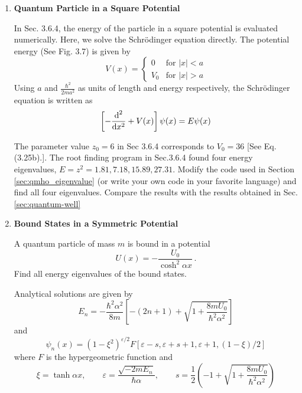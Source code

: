 \begin{enumerate}[labelwidth=0.5cm,labelindent=0cm,leftmargin=*,label=\bfseries \thechapter.\arabic*,align=left]

\item \textbf{Quantum Particle in a Square Potential} 

In Sec. 3.6.4, the energy of the particle in a square potential is evaluated numerically.  Here, we solve the Schr\"{o}dinger equation directly.  The potential energy (See Fig. 3.7) is given by
\begin{equation}
V(x) = \begin{cases}
0 & \text{for } |x|<a \\
V_0 & \text{for } |x|>a
\end{cases}
\end{equation}
Using $a$ and $\displaystyle\frac{\hbar^2}{2m a^2}$ as units of length and energy respectively,
the Schr\"{o}dinger equation is written as
\begin{equation}
\left [-\frac{\text{d}^2}{\text{d} x^2} + V(x) \right ] \psi(x) = E \psi(x)
\end{equation}

The parameter value $z_0=6$ in Sec 3.6.4 corresponds to $V_0=36$  [See Eq. (3.25b).].  The root finding program in Sec.3.6.4 found four energy eigenvalues, $E = z^2 =  1.81, 7.18, 15.89, 27.31$.
Modify the code used in Section \ref{sec:qmho_eigenvalue} (or write your own code in your favorite language) and find all four eigenvalues.  Compare the results with the results obtained in Sec.\ref{sec:quantum-well}

\item \textbf{Bound States in a Symmetric Potential}

A quantum particle of mass $m$ is bound in a potential
\begin{equation}
U(x) = - \frac{U_0}{\cosh^2 \alpha x}\, .
\end{equation}
Find all energy eigenvalues of the bound states.

Analytical solutions are given by
\begin{equation}
E_n = - \frac{\hbar^2 \alpha^2}{8 m} \left [ -(2n+1)+\sqrt{1+\frac{8 m U_0}{\hbar^2 \alpha^2}} \right ]
\end{equation}
and
\begin{equation}
\psi_n(x) = (1-\xi^2)^{\varepsilon/2} F[\varepsilon-s, \varepsilon+s+1,\varepsilon+1,(1-\xi)/2]
\end{equation}
where $F$ is the hypergeometric function and
\begin{equation}
\xi=\tanh \alpha x, \qquad \varepsilon = \frac{\sqrt{-2 m E_n}}{\hbar \alpha}, \qquad s=\frac{1}{2} \left ( -1+\sqrt{1+\frac{8 m U_0}{\hbar^2 \alpha^2}} \right )
\end{equation}

\end{enumerate}

